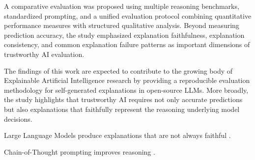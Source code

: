 \documentclass{article}
\begin{document}
A comparative evaluation was proposed using multiple reasoning benchmarks, standardized prompting, and a unified evaluation protocol combining quantitative performance measures with structured qualitative analysis. Beyond measuring prediction accuracy, the study emphasized explanation faithfulness, explanation consistency, and common explanation failure patterns as important dimensions of trustworthy AI evaluation.

The findings of this work are expected to contribute to the growing body of Explainable Artificial Intelligence research by providing a reproducible evaluation methodology for self-generated explanations in open-source LLMs. More broadly, the study highlights that trustworthy AI requires not only accurate predictions but also explanations that faithfully represent the reasoning underlying model decisions.






Large Language Models produce explanations that are not always faithful
\cite{madsen2024selfexplanations}.

Chain-of-Thought prompting improves reasoning
\cite{wei2022chain}.



\end{document}
